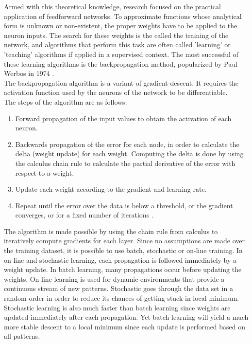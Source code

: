 \documentclass[12pt,oneside]{CUNY_CS_PhD}
\begin{document}
Armed with this theoretical knowledge, research focused on the practical application of feedforward networks. To approximate functions whose analytical form is unknown or non-existent, the proper weights have to be applied to the neuron inputs. The search for these weights is the called the training of the network, and algorithms that perform this task are often called 'learning' or 'teaching' algorithms if applied in a supervised context. The most successful of these learning algorithms is the backpropagation method, popularized by Paul Werbos in 1974 \cite{werbos1974beyond}.\\
The backpropagation algorithm is a variant of gradient-descent.
It requires the activation function used by the neurons of the network to be differentiable.\\
The steps of the algorithm are as follows:
\begin{enumerate}
\item Forward propagation of the input values to obtain the activation of each neuron.
\item Backwards propagation of the error for each node, in order to calculate the delta (weight update) for each weight. Computing the delta is done by using the calculus chain rule to calculate the partial derivative of the error with respect to a  weight.
\item Update each weight according to the gradient and learning rate. 
\item Repeat until the error over the data is below a threshold, or the gradient converges, or for a fixed number of iterations .
\end{enumerate}
The algorithm is made possible by using the chain rule from calculus to iteratively compute gradients for each layer. Since no assumptions are made over the training dataset, it is possible to use batch, stochastic or on-line training. In on-line and stochastic learning, each propagation is followed immediately by a weight update. In batch learning, many propagations occur before updating the weights. On-line learning is used for dynamic environments that provide a continuous stream of new patterns. Stochastic goes through the data set in a random order in order to reduce its chances of getting stuck in local minimum. Stochastic learning is also much faster than batch learning since weights are updated immediately after each propagation. Yet batch learning will yield a much more stable descent to a local minimum since each update is performed based on all patterns.\\
\end{document}
